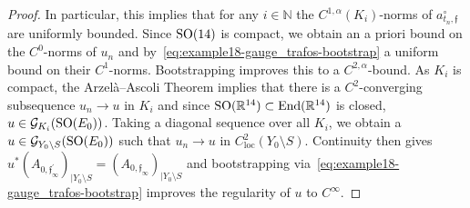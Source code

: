 \documentclass[11pt,a4paper]{scrartcl}
\newcommand{\End}{\textup{End}}
\newcommand{\SO}{\textup{SO}}
\numberwithin{equation}{section}
\theoremstyle{plain}
\theoremstyle{definition}
\theoremstyle{remark}
\begin{document}
\begin{proof}
In particular, this implies that for any $i\in \mathbb{N}$ the $C^{1,\alpha}(K_i)$-norms of $a_{t_n,\mathfrak{f}}^\circ$ are uniformly bounded. Since $\SO(14)$ is compact, we obtain an a priori bound on the $C^0$-norms of $u_n$ and by~\eqref{eq:example18-gauge_trafos-bootstrap} a uniform bound on their $C^1$-norms. Bootstrapping improves this to a $C^{2,\alpha}$-bound. As $K_i$ is compact, the Arzelà--Ascoli Theorem implies that there is a $C^2$-converging subsequence $u_n \to u$ in $K_i$ and since $\SO(\mathbb{R}^{14}) \subset \End(\mathbb{R}^{14})$ is closed, $u \in \mathcal{G}_{K_i}(\SO(E_0))$. Taking a diagonal sequence over all $K_i$, we obtain a $u\in \mathcal{G}_{Y_0\setminus S}(\SO(E_0))$ such that $u_n \to u$ in $C^2_{\text{loc}}(Y_0 \setminus S)$. Continuity then gives $u^*(A_{0,\mathfrak{f}_\infty^\prime})_{\vert Y_0\setminus S}=(A_{0,\mathfrak{f}_\infty})_{\vert Y_0\setminus S}$ and bootstrapping via~\eqref{eq:example18-gauge_trafos-bootstrap} improves the regularity of $u$ to $C^\infty$.


\end{proof}
\end{document}
